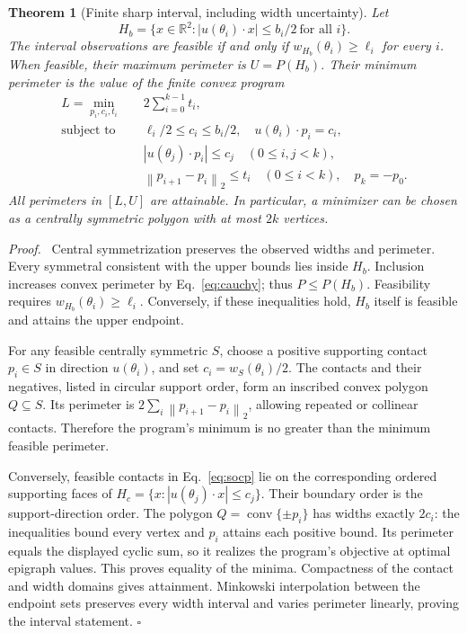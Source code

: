 \documentclass[11pt,a4paper]{article}
\newtheorem{theorem}{Theorem}
\newenvironment{proof}{\par\noindent\textit{Proof.}\ }{\hfill$\square$\par\medskip}
\newcommand{\R}{\mathbb R}
\newcommand{\norm}[1]{\left\lVert#1\right\rVert}
\DeclareMathOperator{\conv}{conv}
\begin{document}
\begin{theorem}[Finite sharp interval, including width uncertainty]
\label{thm:finite}
Let
\begin{equation}
H_b=\{x\in\R^2:|u(\theta_i)\cdot x|\le b_i/2\ \text{for all }i\}.
\label{eq:strip}
\end{equation}
The interval observations are feasible if and only if $w_{H_b}(\theta_i)\ge\ell_i$ for every $i$. When feasible, their maximum perimeter is $U=P(H_b)$. Their minimum perimeter is the value of the finite convex program
\begin{align}
L=\min_{p_i,c_i,t_i}\quad &2\sum_{i=0}^{k-1}t_i,\nonumber\\
\text{subject to}\quad
&\ell_i/2\le c_i\le b_i/2,\quad u(\theta_i)\cdot p_i=c_i,\nonumber\\
&|u(\theta_j)\cdot p_i|\le c_j\quad(0\le i,j<k),\label{eq:socp}\\
&\norm{p_{i+1}-p_i}_2\le t_i\quad(0\le i<k),\quad p_k=-p_0.\nonumber
\end{align}
All perimeters in $[L,U]$ are attainable. In particular, a minimizer can be chosen as a centrally symmetric polygon with at most $2k$ vertices.
\end{theorem}
\begin{proof}
Central symmetrization preserves the observed widths and perimeter. Every symmetral consistent with the upper bounds lies inside $H_b$. Inclusion increases convex perimeter by Eq.~\eqref{eq:cauchy}; thus $P\le P(H_b)$. Feasibility requires $w_{H_b}(\theta_i)\ge\ell_i$. Conversely, if these inequalities hold, $H_b$ itself is feasible and attains the upper endpoint.

For any feasible centrally symmetric $S$, choose a positive supporting contact $p_i\in S$ in direction $u(\theta_i)$, and set $c_i=w_S(\theta_i)/2$. The contacts and their negatives, listed in circular support order, form an inscribed convex polygon $Q\subseteq S$. Its perimeter is $2\sum_i\norm{p_{i+1}-p_i}_2$, allowing repeated or collinear contacts. Therefore the program's minimum is no greater than the minimum feasible perimeter.

Conversely, feasible contacts in Eq.~\eqref{eq:socp} lie on the corresponding ordered supporting faces of $H_c=\{x:|u(\theta_j)\cdot x|\le c_j\}$. Their boundary order is the support-direction order. The polygon $Q=\conv\{\pm p_i\}$ has widths exactly $2c_i$: the inequalities bound every vertex and $p_i$ attains each positive bound. Its perimeter equals the displayed cyclic sum, so it realizes the program's objective at optimal epigraph values. This proves equality of the minima. Compactness of the contact and width domains gives attainment. Minkowski interpolation between the endpoint sets preserves every width interval and varies perimeter linearly, proving the interval statement.
\end{proof}
\end{document}
